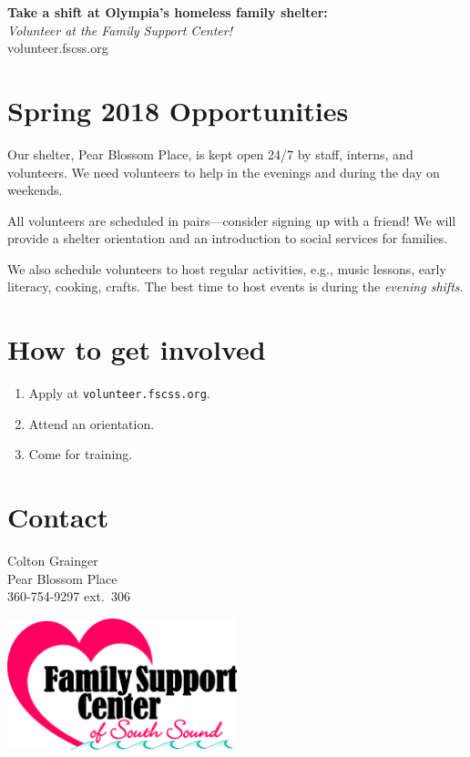 \documentclass[14pt]{extarticle}
\begin{document}
\pagestyle{empty}
\noindent
{\Huge \bf Take a shift at Olympia's homeless family shelter:}\\
{\LARGE \emph{Volunteer at the Family Support Center!}}\\
{\Huge {} \selectfont volunteer.fscss.org}

\section*{Spring 2018 Opportunities}

\large
Our shelter, Pear Blossom Place, is kept open 24/7 by staff, interns, and volunteers. We need volunteers to help in the evenings and during the day on weekends. 

All volunteers are scheduled in pairs---consider signing up with a friend! We will provide a shelter orientation and an introduction to social services for families.

We also schedule volunteers to host regular activities, e.g., music lessons, early literacy, cooking, crafts. The best time to host events is during the \emph{evening shifts}.

\section*{How to get involved}
\begin{enumerate}[itemsep=0pt]
	\item Apply at {\Large\texttt{volunteer.fscss.org}}.
    \item Attend an orientation. 
    \item Come for training.
\end{enumerate}
\normalsize
\section*{Contact}
Colton Grainger\\
Pear Blossom Place\\
360-754-9297 ext.\ 306

\vspace{-140pt}
\begin{flushright}
\includegraphics[width = 0.5\textwidth]{logo.jpg}
\end{flushright}
\end{document}
